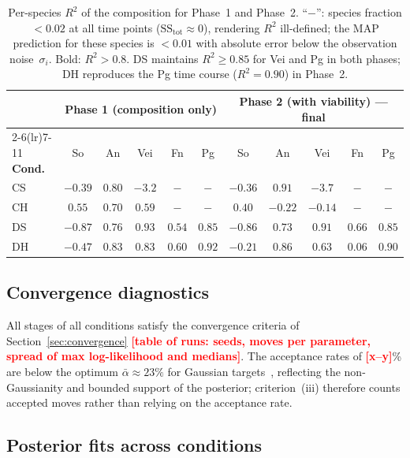 \documentclass[11pt,a4paper]{article}
\newcommand{\TBD}[1]{\textcolor{red}{\textbf{[#1]}}}
\begin{document}
\begin{table}[htbp]
\centering\footnotesize\setlength{\tabcolsep}{3pt}
\begin{tabular}{@{}l ccccc ccccc@{}}
\toprule
& \multicolumn{5}{c}{\textbf{Phase 1 (composition only)}} & \multicolumn{5}{c}{\textbf{Phase 2 (with viability) --- final}}\\
\cmidrule(lr){2-6}\cmidrule(lr){7-11}
\textbf{Cond.} & So & An & Vei & Fn & Pg & So & An & Vei & Fn & Pg\\
\midrule
CS  & $-0.39$ & $0.80$ & $-3.2$ & $-$ & $-$ & $-0.36$ & $\mathbf{0.91}$ & $-3.7$ & $-$ & $-$\\
CH  & $0.55$  & $0.70$ & $0.59$  & $-$ & $-$ & $0.40$  & $-0.22$ & $-0.14$ & $-$ & $-$\\
DS  & $-0.87$ & $0.76$ & $\mathbf{0.93}$ & $0.54$ & $\mathbf{0.85}$ & $-0.86$ & $0.73$ & $\mathbf{0.91}$ & $0.66$ & $\mathbf{0.85}$\\
DH  & $-0.47$ & $\mathbf{0.83}$ & $\mathbf{0.83}$ & $0.60$ & $\mathbf{0.92}$ & $-0.21$ & $\mathbf{0.86}$ & $0.63$ & $0.06$ & $\mathbf{0.90}$\\
\bottomrule
\end{tabular}
\caption{Per-species $R^2$ of the composition for Phase~1 and Phase~2.
``$-$'': species fraction $<0.02$ at all time points ($\mathrm{SS}_{\mathrm{tot}}\approx0$), rendering $R^2$ ill-defined; the MAP prediction for these species is $<0.01$ with absolute error below the observation noise~$\sigma_i$.
Bold: $R^2>0.8$.
DS maintains $R^2\geq0.85$ for Vei and Pg in both phases; DH reproduces the Pg time course ($R^2=0.90$) in Phase~2.}
\label{tab:r2_species}
\end{table}

\subsection{Convergence diagnostics}

All stages of all conditions satisfy the convergence criteria of Section~\ref{sec:convergence} \TBD{table of runs: seeds, moves per parameter, spread of max log-likelihood and medians}.
The acceptance rates of \TBD{x--y}\% are below the optimum $\bar\alpha\approx23\%$ for Gaussian targets~\cite{RobertsRosenthal2001Optimal}, reflecting the non-Gaussianity and bounded support of the posterior; criterion~(iii) therefore counts accepted moves rather than relying on the acceptance rate.

\subsection{Posterior fits across conditions}
\end{document}
